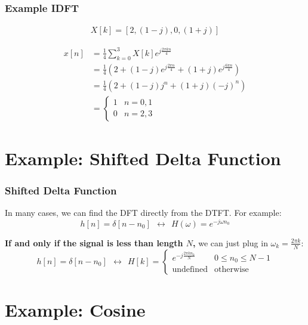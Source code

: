 \documentclass{beamer}
\begin{document}
\begin{frame}
  \frametitle{Example IDFT}
  
  \begin{align*}
    X[k] = [ 2, (1-j), 0, (1+j) ]
  \end{align*}

  \begin{align*}
    x[n] &= \frac{1}{4}\sum_{k=0}^3 X[k]e^{j\frac{2\pi kn}{4}}\\
    &= \frac{1}{4}\left(2+ (1-j)e^{j\frac{2\pi n}{4}}+(1+j)e^{j\frac{6\pi n}{4}}\right)\\
    &= \frac{1}{4}\left(2+ (1-j)j^n +(1+j)(-j)^n\right)\\
    &=\begin{cases}
    1 & n=0,1\\
    0 & n=2,3
    \end{cases}
  \end{align*}
\end{frame}


\section[Delta]{Example: Shifted Delta Function}
\setcounter{subsection}{1}

\begin{frame}
  \frametitle{Shifted Delta Function}

  In many cases, we can find the DFT directly from the DTFT.  For example:
  \begin{displaymath}
    h[n]=\delta[n-n_0] ~~\leftrightarrow~~H(\omega)=e^{-j\omega n_0}
  \end{displaymath}

  {\bf If and only if the signal is less than length $N$,} we can just
  plug in $\omega_k=\frac{2\pi k}{N}$:
  \begin{displaymath}
    h[n]=\delta[n-n_0]~~\leftrightarrow~~
    H[k]=\begin{cases}
    e^{-j\frac{2\pi kn_0}{N}} & 0\le n_0\le N-1\\
    \mbox{undefined} &\mbox{otherwise}
    \end{cases}
  \end{displaymath}
\end{frame}

\section[Cosine]{Example: Cosine}
\setcounter{subsection}{1}
\end{document}
